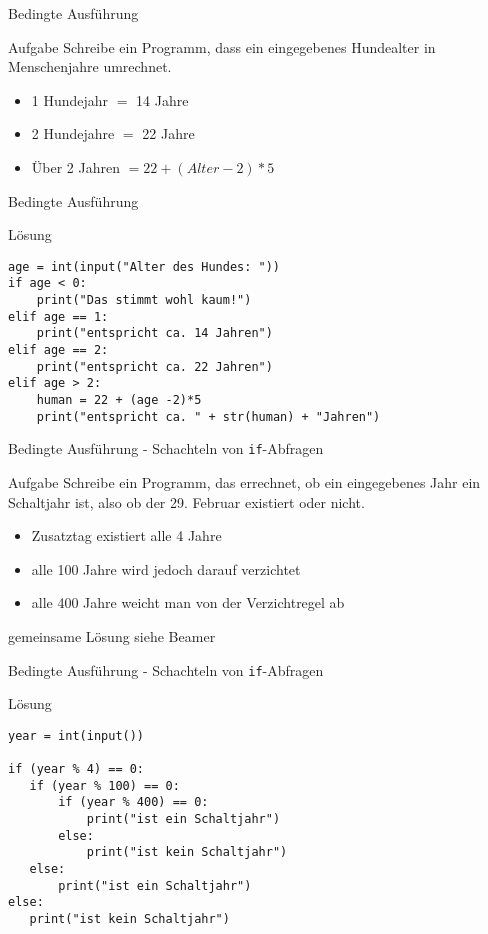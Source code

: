 \begin{frame}{Bedingte Ausführung}
    \begin{block}{Aufgabe}
        Schreibe ein Programm, dass ein eingegebenes Hundealter in Menschenjahre umrechnet.
        \begin{itemize}
            \item 1 Hundejahr $=$ 14 Jahre
            \item 2 Hundejahre $=$ 22 Jahre
            \item Über 2 Jahren $= 22 + (Alter -2) * 5$
        \end{itemize}
    \end{block}
\end{frame}

\begin{frame}[fragile]{Bedingte Ausführung}
    \begin{exampleblock}{Lösung}
        \begin{lstlisting}
age = int(input("Alter des Hundes: "))
if age < 0:
    print("Das stimmt wohl kaum!")
elif age == 1:
    print("entspricht ca. 14 Jahren")
elif age == 2:
    print("entspricht ca. 22 Jahren")
elif age > 2:
    human = 22 + (age -2)*5
    print("entspricht ca. " + str(human) + "Jahren")
        \end{lstlisting}
    \end{exampleblock}
\end{frame}


\begin{frame}{Bedingte Ausführung \hyphen{} Schachteln von \texttt{if}-Abfragen}
    \begin{block}{Aufgabe}
        Schreibe ein Programm, das errechnet, ob ein eingegebenes Jahr ein
        Schaltjahr ist, also ob der 29. Februar existiert oder nicht.
        \begin{itemize}
            \item Zusatztag existiert alle 4 Jahre
            \item alle 100 Jahre wird jedoch darauf verzichtet
            \item alle 400 Jahre weicht man von der Verzichtregel ab
        \end{itemize}
    \end{block}
    \pause{}
    \begin{exampleblock}{gemeinsame Lösung}
    siehe Beamer
    \end{exampleblock}
\end{frame}

\begin{frame}[fragile]{Bedingte Ausführung \hyphen{} Schachteln von \texttt{if}-Abfragen}
    \begin{exampleblock}{Lösung}
        \begin{lstlisting}
year = int(input())

if (year % 4) == 0:
   if (year % 100) == 0:
       if (year % 400) == 0:
           print("ist ein Schaltjahr")
       else:
           print("ist kein Schaltjahr")
   else:
       print("ist ein Schaltjahr")
else:
   print("ist kein Schaltjahr")
       \end{lstlisting}
    \end{exampleblock}
\end{frame}


